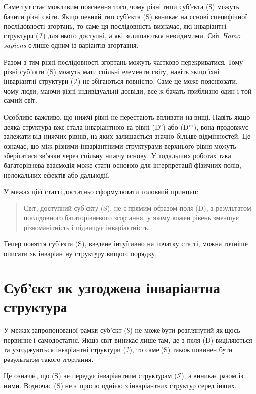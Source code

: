 \documentclass[aps,prd,onecolumn,nofootinbib,superscriptaddress]{revtex4-2}
\begin{document}
Саме тут стає можливим пояснення того, чому різні типи суб’єкта (S) можуть бачити різні світи. Якщо певний тип суб’єкта (S) виникає на основі специфічної послідовності згортань, то саме ця послідовність визначає, які інваріантні структури ($\mathcal{I}$) для нього доступні, а які залишаються невидимими. Світ \emph{Homo sapiens} є лише одним із варіантів згортання.

Разом з тим різні послідовності згортань можуть частково перекриватися. Тому різні суб’єкти (S) можуть мати спільні елементи світу, навіть якщо їхні інваріантні структури ($\mathcal{I}$) не збігаються повністю. Саме це може пояснювати, чому люди, маючи різні індивідуальні досвіди, все ж бачать приблизно один і той самий світ.

Особливо важливо, що нижчі рівні не перестають впливати на вищі. Навіть якщо деяка структура вже стала інваріантною на рівні (D'') або (D'''), вона продовжує залежати від нижчих рівнів, на яких залишається значно більше відмінностей. Це означає, що між різними інваріантними структурами верхнього рівня можуть зберігатися зв’язки через спільну нижчу основу. У подальших роботах така багаторівнева взаємодія може стати основою для інтерпретації фізичних полів, нелокальних ефектів або дальнодії.

У межах цієї статті достатньо сформулювати головний принцип:

\begin{quote}
Світ, доступний суб’єкту (S), не є прямим образом поля (D), а результатом послідовного багаторівневого згортання, у якому кожен рівень зменшує різноманітність і підвищує інваріантність.
\end{quote}

Тепер поняття суб’єкта (S), введене інтуїтивно на початку статті, можна точніше описати як інваріантну структуру вищого порядку.

\section{Суб’єкт як узгоджена інваріантна структура}
У межах запропонованої рамки суб’єкт (S) не може бути розглянутий як щось первинне і самодостатнє. Якщо світ виникає лише там, де з поля (D) виділяються та узгоджуються інваріантні структури ($\mathcal{I}$), то саме (S) також повинен бути результатом такого згортання.

Це означає, що (S) не передує інваріантним структурам ($\mathcal{I}$), а виникає разом із ними. Водночас (S) не є просто однією з інваріантних структур серед інших.
\end{document}
